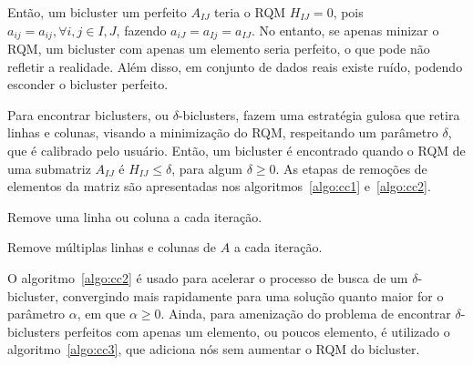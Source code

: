 \documentclass[normaltoc, espacoumemeio, pnumromarab,ruledheader]{abnt}
\begin{document}
    Então, um bicluster um perfeito $A_{IJ}$ teria o RQM $H_{IJ} = 0$, pois $a_{ij} = a_{ij}, \forall i,j \in I,J$, fazendo $a_{iJ} = a_{Ij} = a_{IJ}$. No entanto, se apenas minizar o RQM, um bicluster com apenas um elemento seria perfeito, o que pode não refletir a realidade. Além disso, em conjunto de dados reais existe ruído, podendo esconder o bicluster perfeito.

    Para encontrar biclusters, ou $\delta$-biclusters,  fazem uma estratégia gulosa que retira linhas e colunas, visando a minimização do RQM, respeitando um parâmetro $\delta$, que é calibrado pelo usuário. Então, um bicluster é encontrado quando o RQM de uma submatriz $A_{IJ}$ é $H_{IJ} \leq \delta$, para algum $\delta \geq 0$. As etapas de remoções de elementos da matriz são apresentadas nos algoritmos~\ref{algo:cc1} e~\ref{algo:cc2}.

    \begin{algorithm}[H]
    \label{algo:cc1}
     \caption{Remove uma linha ou coluna a cada iteração.}
    \end{algorithm}

    \begin{algorithm}[H]
    \label{algo:cc2}
     \caption{Remove múltiplas linhas e colunas de $A$ a cada iteração.}
    \end{algorithm}

    O algoritmo~\ref{algo:cc2} é usado para acelerar o processo de busca de um $\delta$-bicluster, convergindo mais rapidamente para uma solução quanto maior for o parâmetro $\alpha$, em que $\alpha \geq 0$. Ainda, para amenização do problema de encontrar $\delta$-biclusters perfeitos com apenas um elemento, ou poucos elemento, é utilizado o algoritmo~\ref{algo:cc3}, que adiciona nós sem aumentar o RQM do bicluster.
\end{document}
